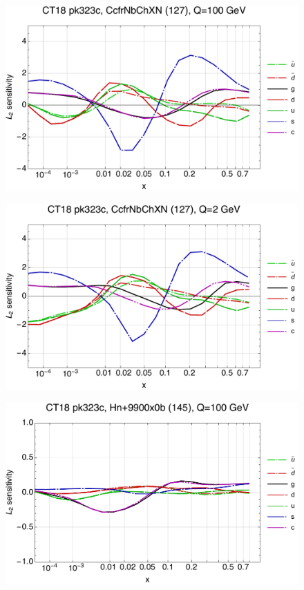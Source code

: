 \documentclass[10pt,aps,prd,floatfix,titlepage]{revtex4}
\begin{document}
\clearpage
\begin{figure}
\includegraphics[width=\textwidth,height=0.44\textheight,keepaspectratio]{1/127_ct18nn_L2_q100_Sf_1.pdf}
\caption{}
\end{figure}
\begin{figure}
\includegraphics[width=\textwidth,height=0.44\textheight,keepaspectratio]{1/127_ct18nn_L2_q2_Sf_1.pdf}
\caption{}
\end{figure}
\clearpage
\begin{figure}
\includegraphics[width=\textwidth,height=0.44\textheight,keepaspectratio]{1/145_ct18nn_L2_q100_Sf_1.pdf}
\caption{}
\end{figure}
\end{document}
